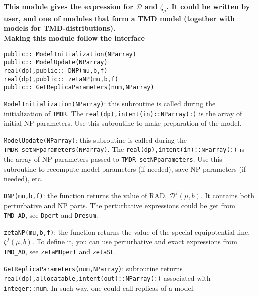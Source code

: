 \documentclass[prd,nofootinbib,eqsecnum,final]{revtex4}
\renewcommand{\(}{\left(}
\renewcommand{\)}{\right)}
\renewcommand{\[}{\left[}
\renewcommand{\]}{\right]}
\newcommand{\blue}[1]{{\color{blue} #1}}
\begin{document}
\begin{tcolorbox}
\begin{center}
\textbf{This module gives the expression for $\mathcal{D}$ and $\zeta_\mu$. It could be written by user, and one of modules that form a TMD model (together with models for TMD-distributions).}
\\
\textbf{\blue{Making this module follow the interface}}
\end{center}
\texttt{public:: ModelInitialization(NParray)}
\\
\texttt{public:: ModelUpdate(NParray)}
\\
\texttt{real(dp),public:: DNP(mu,b,f)}
\\
\texttt{real(dp),public:: zetaNP(mu,b,f)}
\\
\texttt{public:: GetReplicaParameters(num,NParray)}
\end{tcolorbox}

\texttt{ModelInitialization(NParray)}: this subroutine is called during the initialization of \texttt{TMDR}. The \texttt{real(dp),intent(in)::NParray(:)} is the array of initial NP-parameters. Use this subroutine to make preparation of the model.

\vspace{2mm}

\texttt{ModelUpdate(NParray)}: this subroutine is called during the \texttt{TMDR\_setNPparameters(NParray)}. The \texttt{real(dp),intent(in)::NParray(:)} is the array of NP-parameters passed to \texttt{TMDR\_setNPparameters}. Use this subroutine to recompute model parameters (if needed), save NP-parameters (if needed), etc.

\vspace{2mm}

\texttt{DNP(mu,b,f)}: the function returns the value of RAD, $\mathcal{D}^f(\mu,b)$. It contains both perturbative and NP parts. The perturbative expressions could be get from \texttt{TMD\_AD}, see \texttt{Dpert} and \texttt{Dresum}.

\vspace{2mm}

\texttt{zetaNP(mu,b,f)}: the function returns the value of the special equipotential line, $\zeta^f(\mu,b)$. To define it, you can use perturbative and exact expressions from \texttt{TMD\_AD}, see \texttt{zetaMUpert} and \texttt{zetaSL}.

\vspace{2mm}

\texttt{GetReplicaParameters(num,NParray)}: subroutine returns \texttt{real(dp),allocatable,intent(out)::NParray(:)} associated with \texttt{integer::num}. In such way, one could call replicas of a model.
\end{document}
